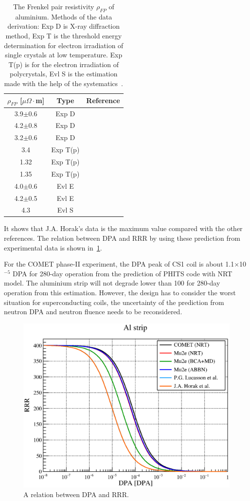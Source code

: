 \begin{table}[H]
 \centering
 \begin{tabular}{ccc} \hline \hline
  $\rho_{FP}$ [$\mu\Omega\cdot$m] & Type & Reference \\ \hline
  3.9$\pm$0.6 & Exp D & \cite{erh1} \\
  4.2$\pm$0.8 & Exp D & \cite{erh2} \\
  3.2$\pm$0.6 & Exp D & \cite{rober} \\
  3.4 & Exp T(p) & \cite{ref1} \\
  1.32 & Exp T(p) & \cite{ref2} \\
  1.35 & Exp T(p) & \cite{ref3} \\
  4.0$\pm$0.6 & Evl E & \cite{ref4} \\
  4.2$\pm$0.5 & Evl E & \cite{ref5} \\
  4.3 & Evl S & \cite{ref6} \\ \hline \hline
 \end{tabular}
 \caption{The Frenkel pair resistivity $\rho_{FP}$ of aluminium. Methods of the data derivation: Exp D is X-ray diffraction method, Exp T is the threshold energy determination for electron irradiation of single crystals at low temperature. Exp T(p) is for the electron irradiation of polycrystals, Evl S is the estimation made with the help of the systematics~\cite{yu}.}
 \label{frank}
\end{table}
It shows that J.A. Horak's data is the maximum value compared with the other references.
The relation between DPA and RRR by using these prediction from experimental data is shown in~\ref{dpaaa}.

For the COMET phase-II experiment, the DPA peak of CS1 coil is about 1.1$\times$10$^{-5}$ DPA for 280-day operation from the prediction of PHITS code with NRT model.
The aluminium strip will not degrade lower than 100 for 280-day operation from this estimation.
However, the design has to consider the worst situation for superconducting coils, the uncertainty of the prediction from neutron DPA and neutron fluence needs to be reconsidered.
\begin{figure}[H]
 \centering
 \includegraphics[scale=0.5]{chapter4/fig/dpadegradation.eps}
 \caption{ A relation between DPA and RRR.}
 \label{dpaaa}
\end{figure}

